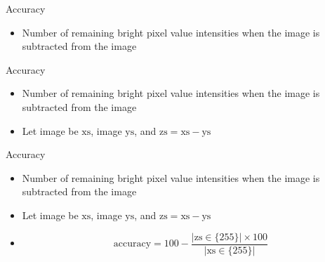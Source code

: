\begin{frame}{Accuracy}
    \begin{itemize}
        \item Number of remaining bright pixel value intensities when the \usno image is subtracted from the \panstarrs image
    \end{itemize}
\end{frame}

\begin{frame}{Accuracy}
    \begin{itemize}
        \item Number of remaining bright pixel value intensities when the \usno image is subtracted from the \panstarrs image
        \item Let \usno image be $\text{xs}$, \panstarrs image $\text{ys}$, and $\text{zs} = \text{xs} - \text{ys}$
    \end{itemize}
\end{frame}

\begin{frame}{Accuracy}
    \begin{itemize}
        \item Number of remaining bright pixel value intensities when the \usno image is subtracted from the \panstarrs image
        \item Let \usno image be $\text{xs}$, \panstarrs image $\text{ys}$, and $\text{zs} = \text{xs} - \text{ys}$
        \item 
            \begin{equation}
                \text{accuracy} = 100 - \frac{|\text{zs} \in \{255\} | \times 100}{|\text{xs} \in \{255\} |}
            \end{equation}
    \end{itemize}
\end{frame}